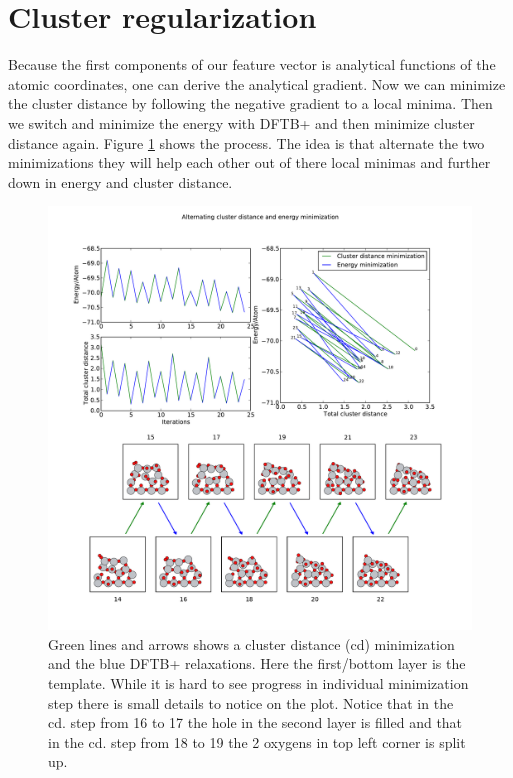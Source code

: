 \documentclass[%
 aps,
 prl,%
 amsmath,amssymb,
 reprint,%
]{revtex4-1}
\begin{document}
\section{Cluster regularization}

Because the first components of our feature vector is analytical functions of the atomic coordinates, one can derive the analytical gradient. Now we can minimize the cluster distance by following the negative gradient to a local minima. Then we switch and minimize the energy with DFTB+ and then minimize cluster distance again. Figure \ref{fig_min} shows the process. The idea is that alternate the two minimizations they will help each other out of there local minimas and further down in energy and cluster distance.
   
\begin{figure}[h]
    \centering
    \includegraphics[width=2.0\columnwidth]{acdminplot_74_98_ridgemin2_5_9_500_Ti13O26Ridge.pdf}
    \caption{Green lines and arrows shows a cluster distance (cd) minimization and the blue DFTB+ relaxations. Here the first/bottom layer is the template. While it is hard to see progress in individual minimization step there is small details to notice on the plot. Notice that in the cd. step from 16 to 17 the hole in the second layer is filled and that in the cd. step from 18 to 19 the 2 oxygens in top left corner is split up.}
    \label{fig_min}
\end{figure}
\end{document}
